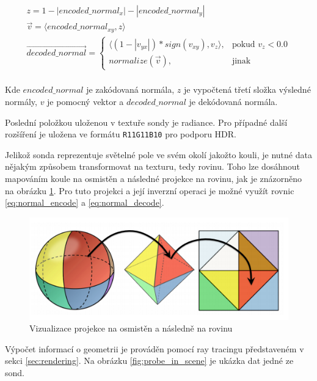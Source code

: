 \begin{equation} \label{eq:normal_decode}
	\begin{gathered}
	    z = 1 - |encoded\_normal_x| - |encoded\_normal_y|\\
	    \vec{v} = \langle encoded\_normal_{xy}, z \rangle\\
		\vec{decoded\_normal} = \begin{cases}
            \langle (1 - |v_{yx}|) * sign(v_{xy}), v_z \rangle,& \text{pokud } v_z < 0.0\\
            normalize(\vec{v}),              & \text{jinak}
        \end{cases}\\
	\end{gathered}
\end{equation}

Kde $encoded\_normal$ je zakódovaná normála, $z$ je vypočtená třetí složka výsledné normály, $v$ je pomocný vektor a $decoded\_normal$ je dekódovaná normála.

Poslední položkou uloženou v textuře sondy je radiance. Pro případné další rozšíření je uložena ve formátu \texttt{R11G11B10} pro podporu HDR.

Jelikož sonda reprezentuje světelné pole ve svém okolí jakožto kouli, je nutné data nějakým způsobem transformovat na texturu, tedy rovinu. Toho lze dosáhnout mapováním koule na osmistěn a následné projekce na rovinu, jak je znázorněno na obrázku \ref{fig:octahedral_wrap}. Pro tuto projekci a její inverzní operaci je možné využít rovnic \ref{eq:normal_encode} a \ref{eq:normal_decode}.

\begin{figure}[H]
	\centering
	\includegraphics[scale=2]{images/octahedral_wrap.png}
	\caption{Vizualizace projekce na osmistěn a následně na rovinu}
	\label{fig:octahedral_wrap}
\end{figure}

Výpočet informací o geometrii je prováděn pomocí ray tracingu představeném v sekci \ref{sec:rendering}. Na obrázku \ref{fig:probe_in_scene} je ukázka dat jedné ze sond.


